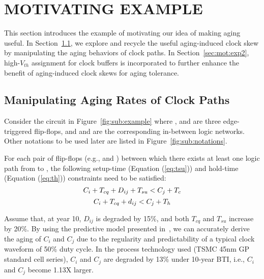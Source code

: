 \section{MOTIVATING EXAMPLE}
\label{sec:motivate}


This section introduces the example of motivating our idea of making aging useful. In Section~\ref{sec:mot:exp1}, we explore and recycle the useful aging-induced clock skew by manipulating the aging behaviors of clock paths. In Section~\ref{sec:mot:exp2}, high-$V_{th}$ assignment for clock buffers is incorporated to further enhance the benefit of aging-induced clock skews for aging tolerance. 

\subsection{Manipulating Aging Rates of Clock Paths}
\label{sec:mot:exp1}
Consider the circuit in Figure~\ref{fig:sub:example} where ,  and  are three edge-triggered flip-flops, and  and  are the corresponding in-between logic networks. Other notations to be used later are listed in Figure~\ref{fig:sub:notations}.

For each pair of flip-flops (e.g.,  and ) between which there exists at least one logic path from  to , the following setup-time (Equation (\ref{eq:tsu})) and hold-time (Equation (\ref{eq:th})) constraints need to be satisfied:
\begin{equation}
	\fontsize{9}{9.6} C_i+T_{cq}+D_{ij}+T_{su}<C_j+T_c
	\label{eq:tsu}
\end{equation}
\begin{equation}
	\fontsize{9}{9.6} C_i+T_{cq}+d_{ij}<C_j+T_h
	\label{eq:th}
\end{equation}

Assume that, at year 10, $D_{ij}$ is degraded by 15\%, and both $T_{cq}$ and $T_{su}$ increase by 20\%. By using the predictive model presented in~\cite{wang2010impact, wang2007efficient, amrouch2016reliability}, we can accurately derive the aging of $C_i$ and $C_j$ due to the regularity and predictability of a typical clock waveform of 50\% duty cycle. In the process technology used (TSMC 45nm GP standard cell series), $C_i$ and $C_j$ are degraded by 13\% under 10-year BTI, i.e., $C_i$ and $C_j$ become 1.13X larger.

